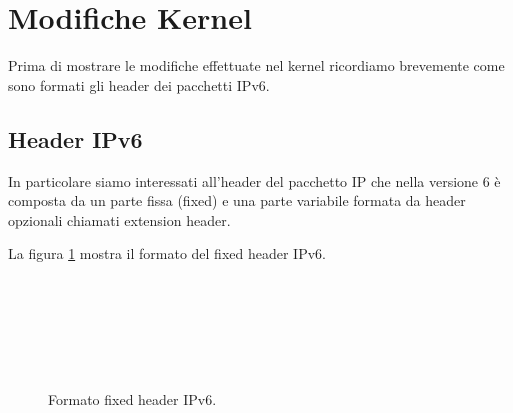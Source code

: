 \documentclass[a4paper,10pt]{article}
\begin{document}
\newpage
\section{Modifiche Kernel}
Prima di mostrare le modifiche effettuate nel kernel ricordiamo
brevemente come sono formati gli header dei pacchetti IPv6.

\subsection{Header IPv6}
In particolare siamo interessati all'header del pacchetto IP che nella
versione 6 è composta da un parte fissa (fixed) e una parte variabile
formata da header opzionali chiamati extension header. 

La figura \ref{fig:fixedhdr} mostra il formato del fixed header IPv6. 

\begin{figure} [H]
	\begin{center}
		\begin{bytefield}[bitwidth=1.1em]{32}
			\\
			
			\\
			
			 \\
			
			 \\
			 \\
		\end{bytefield}
		\caption{Formato fixed header IPv6.}
		\label{fig:fixedhdr}
	\end{center}
\end{figure}
\end{document}
